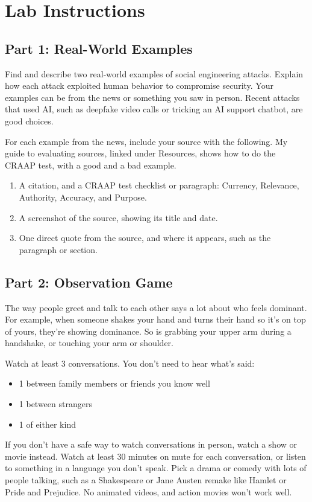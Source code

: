 \documentclass[12pt]{article}
\begin{document}
\section*{Lab Instructions}
\subsection*{Part 1: Real-World Examples}
Find and describe two real-world examples of social engineering attacks. Explain how each attack exploited human behavior to compromise security. Your examples can be from the news or something you saw in person. Recent attacks that used AI, such as deepfake video calls or tricking an AI support chatbot, are good choices.

For each example from the news, include your source with the following. My guide to evaluating sources, linked under Resources, shows how to do the CRAAP test, with a good and a bad example.
\begin{enumerate}
    \item A citation, and a CRAAP test checklist or paragraph: Currency, Relevance, Authority, Accuracy, and Purpose.
    \item A screenshot of the source, showing its title and date.
    \item One direct quote from the source, and where it appears, such as the paragraph or section.
\end{enumerate}

\subsection*{Part 2: Observation Game}
The way people greet and talk to each other says a lot about who feels dominant. For example, when someone shakes your hand and turns their hand so it's on top of yours, they're showing dominance. So is grabbing your upper arm during a handshake, or touching your arm or shoulder.

Watch at least 3 conversations. You don't need to hear what's said:
\begin{itemize}
    \item 1 between family members or friends you know well
    \item 1 between strangers
    \item 1 of either kind
\end{itemize}
If you don't have a safe way to watch conversations in person, watch a show or movie instead. Watch at least 30 minutes on mute for each conversation, or listen to something in a language you don't speak. Pick a drama or comedy with lots of people talking, such as a Shakespeare or Jane Austen remake like Hamlet or Pride and Prejudice. No animated videos, and action movies won't work well.
\end{document}
